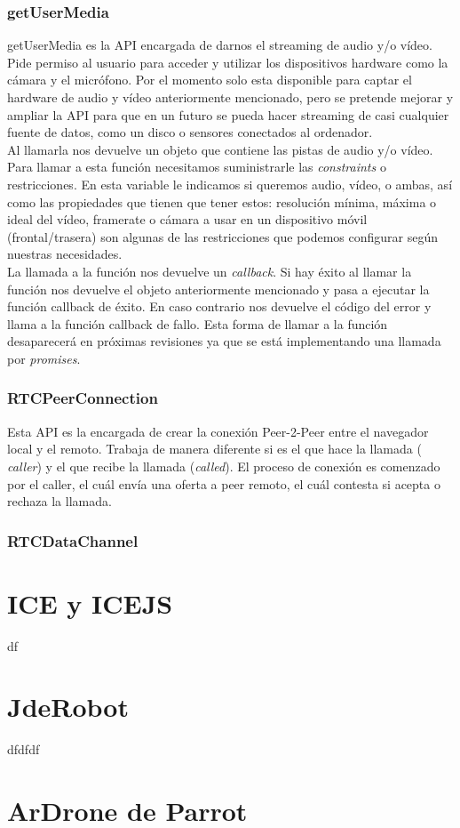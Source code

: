 \subsubsection{getUserMedia} 

getUserMedia es la API encargada de darnos el streaming de audio y/o vídeo. Pide permiso al usuario para acceder y utilizar los dispositivos hardware como la cámara y el micrófono. Por el momento solo esta disponible para captar el hardware de audio y vídeo anteriormente mencionado, pero se pretende mejorar y ampliar la API para que en un futuro se pueda hacer streaming de casi cualquier fuente de datos, como un disco o sensores conectados al ordenador.\\

Al llamarla nos devuelve un objeto que contiene las pistas de audio y/o vídeo. Para llamar a esta función necesitamos suministrarle las \textit{constraints} o restricciones. En esta variable le indicamos si queremos audio, vídeo, o ambas, así como las propiedades que tienen que tener estos: resolución mínima, máxima o ideal del vídeo, framerate o cámara a usar en un dispositivo móvil (frontal/trasera) son algunas de las restricciones que podemos configurar según nuestras necesidades.\\

La llamada a la función nos devuelve un \textit{callback}. Si hay éxito al llamar la función nos devuelve el objeto anteriormente mencionado y pasa a ejecutar la función callback de éxito. En caso contrario nos devuelve el código del error y llama a la función callback de fallo. Esta forma de llamar a la función desaparecerá en próximas revisiones ya que se está implementando una llamada por \textit{promises}.\\


\subsubsection{RTCPeerConnection}

Esta API es la encargada de crear la conexión Peer-2-Peer entre el navegador local y el remoto. Trabaja de manera diferente si es el que hace la llamada ( \textit{caller}) y el que recibe la llamada (\textit{called}). El proceso de conexión es comenzado por el caller, el cuál envía una oferta a peer remoto, el cuál contesta si acepta o rechaza la llamada.

\subsubsection{RTCDataChannel}


\section{ICE y ICEJS}

df

\section{JdeRobot}

dfdfdf

\section{ArDrone de Parrot}

